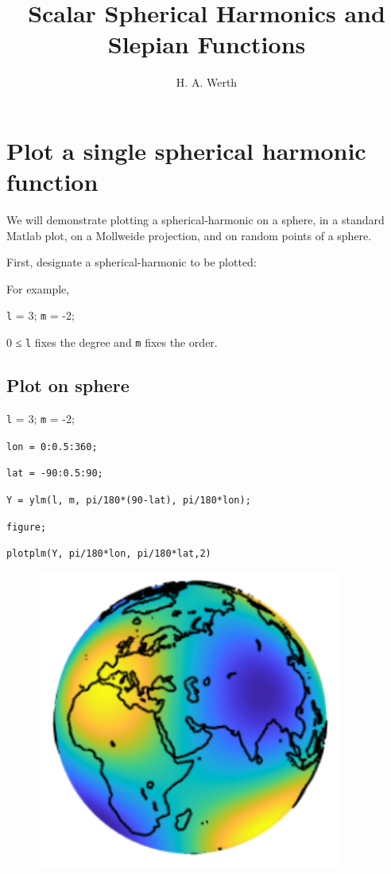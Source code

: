 \documentclass{article}
\title{Scalar Spherical Harmonics and Slepian Functions}
\author{H. A. Werth}
\date{}
\begin{document}
\maketitle

\tableofcontents 

\section{Plot a single spherical harmonic function}

We will demonstrate plotting a spherical-harmonic on a sphere,  in a standard Matlab plot, on a Mollweide projection, and on random points of a sphere.

First, designate a spherical-harmonic to be plotted:

For example,

\verb+l+ = 3; \verb+m+ = -2;

0 ≤ \verb+l+ fixes the degree and \verb+m+ fixes the order.

\subsection{Plot on sphere}

\setlength{\parskip}{.1mm}

\verb+l+ = 3; \verb+m+ = -2;

\verb+lon = 0:0.5:360;+

\verb+lat = -90:0.5:90;+

\verb+Y = ylm(l, m, pi/180*(90-lat), pi/180*lon);+

\verb+figure;+

\verb+plotplm(Y, pi/180*lon, pi/180*lat,2)+

\begin{figure}[H]
\includegraphics[scale=1]{graph_on_sphere}
\end{figure}
\end{document}
